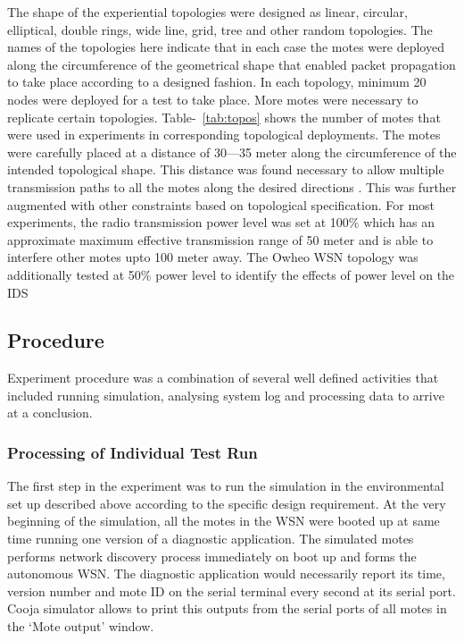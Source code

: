 \documentclass[conference,final]{IEEEtran}
\begin{document}
The shape of the experiential topologies were designed as linear, circular, elliptical, double rings, wide line, grid, tree and other random topologies.
The names of the topologies here indicate that in each case the motes were deployed along the circumference of the geometrical shape that enabled packet propagation to take place according to a designed fashion.
In each topology, minimum 20 nodes were deployed for a test to take place. 
More motes were necessary to replicate certain topologies.
Table-~\ref{tab:topos} shows the number of motes that were used in experiments in corresponding topological  deployments.
The motes were carefully placed at a distance of 30---35 meter along the circumference of the intended topological shape. 
This distance was found necessary to allow  multiple transmission paths to all the motes along the desired directions . 
This was further augmented with other constraints based on topological specification.
For most experiments, the radio transmission power level was set at 100\% which has an approximate maximum effective transmission range of 50 meter and is able to interfere other motes upto 100 meter away.
The Owheo WSN topology was additionally tested at 50\%  power level to identify the effects of power level on the IDS



\subsection*{Procedure}
\label{subsec:proc}

Experiment procedure  was a combination of several well defined activities  that included running simulation, analysing system log and processing data to arrive at a conclusion. 


\subsubsection*{Processing  of Individual Test Run}
The first step in the experiment was to run the simulation in the environmental set up described above according to the specific design requirement. 
At the very beginning of the simulation, all the motes in the WSN were booted up at same time running one version of a diagnostic application. 
The simulated motes performs network discovery process immediately on boot up and forms the autonomous WSN.
The diagnostic application would necessarily report its time, version number and mote ID on the serial terminal every second at its serial port. 
Cooja simulator allows to print this outputs from the serial ports of all motes in the `Mote output' window.
\end{document}
